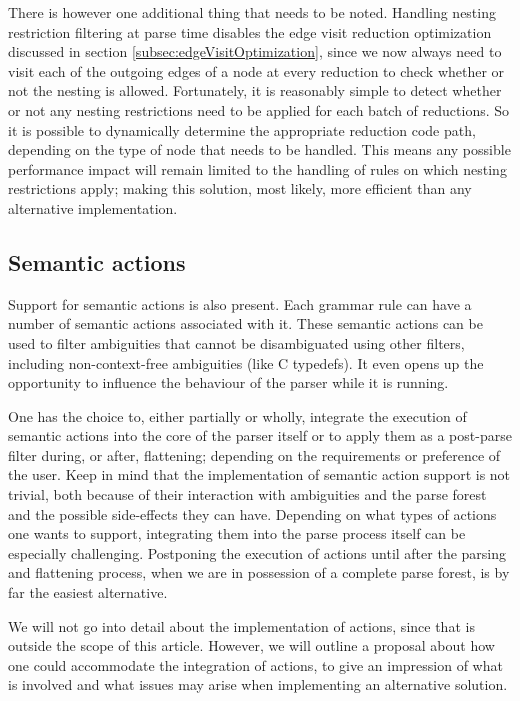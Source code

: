 \documentclass[a4paper,10pt]{article}
\begin{document}
There is however one additional thing that needs to be noted. Handling nesting restriction filtering at parse time disables the edge visit reduction optimization discussed in section \ref{subsec:edgeVisitOptimization}, since we now always need to visit each of the outgoing edges of a node at every reduction to check whether or not the nesting is allowed. Fortunately, it is reasonably simple to detect whether or not any nesting restrictions need to be applied for each batch of reductions. So it is possible to dynamically determine the appropriate reduction code path, depending on the type of node that needs to be handled. This means any possible performance impact will remain limited to the handling of rules on which nesting restrictions apply; making this solution, most likely, more efficient than any alternative implementation.

\subsection{Semantic actions}

Support for semantic actions is also present. Each grammar rule can have a number of semantic actions associated with it. These semantic actions can be used to filter ambiguities that cannot be disambiguated using other filters, including non-context-free ambiguities (like C typedefs). It even opens up the opportunity to influence the behaviour of the parser while it is running.

One has the choice to, either partially or wholly, integrate the execution of semantic actions into the core of the parser itself or to apply them as a post-parse filter during, or after, flattening; depending on the requirements or preference of the user. Keep in mind that the implementation of semantic action support is not trivial, both because of their interaction with ambiguities and the parse forest and the possible side-effects they can have. Depending on what types of actions one wants to support, integrating them into the parse process itself can be especially challenging. Postponing the execution of actions until after the parsing and flattening process, when we are in possession of a complete parse forest, is by far the easiest alternative.

We will not go into detail about the implementation of actions, since that is outside the scope of this article. However, we will outline a proposal about how one could accommodate the integration of actions, to give an impression of what is involved and what issues may arise when implementing an alternative solution.
\end{document}
